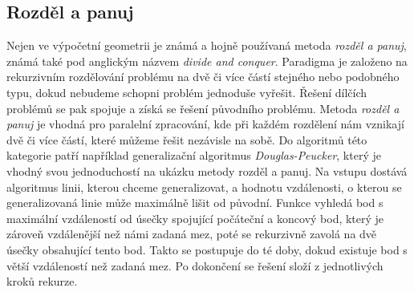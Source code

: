 	
	
\subsection{Rozděl a panuj}
Nejen ve výpočetní geometrii je známá a hojně používaná metoda
\textit{rozděl a panuj}, známá také pod anglickým názvem
\textit{divide and conquer}. Paradigma je založeno na rekurzivním
rozdělování problému na dvě či více částí stejného nebo podobného
typu, dokud nebudeme schopni problém jednoduše vyřešit. Řešení dílčích
problémů se pak spojuje a získá se řešení původního problému. Metoda
\textit{rozděl a panuj} je vhodná pro paralelní zpracování, kde při
každém rozdělení nám vznikají dvě či více částí, které můžeme řešit
nezávisle na sobě.\cite{frigo1999cache} Do algoritmů této kategorie
patří například generalizační algoritmus
\textit{Douglas-Peucker}\cite{van1997algorithmic}, který je vhodný
svou jednoduchostí na ukázku metody rozděl a panuj.  Na vstupu dostává
algoritmus linii, kterou chceme generalizovat, a hodnotu vzdálenosti,
o kterou se generalizovaná linie může maximálně lišit od
původní. Funkce vyhledá bod s maximální vzdáleností od úsečky
spojující počáteční a koncový bod, který je zároveň vzdálenější než
námi zadaná mez, poté se rekurzivně zavolá na dvě úsečky obsahující
tento bod. Takto se postupuje do té doby, dokud existuje bod s větší
vzdáleností než zadaná mez. Po dokončení se řešení složí z
jednotlivých kroků rekurze.


